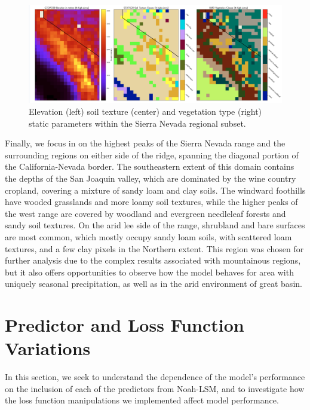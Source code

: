\begin{figure}[h!]
    \centering

    \includegraphics[width=.99\linewidth,draft=false]{figures/lt-static/static_all-3_high-sierra.png}

    \caption{Elevation (left) soil texture (center) and vegetation type (right) static parameters within the Sierra Nevada regional subset.}
    \label{lt_static_high-sierra}
\end{figure}

Finally, we focus in on the highest peaks of the Sierra Nevada range and the surrounding regions on either side of the ridge, spanning the diagonal portion of the California-Nevada border. The southeastern extent of this domain contains the depths of the San Joaquin valley, which are dominated by the wine country cropland, covering a mixture of sandy loam and clay soils. The windward foothills have wooded grasslands and more loamy soil textures, while the higher peaks of the west range are covered by woodland and evergreen needleleaf forests and sandy soil textures. On the arid lee side of the range, shrubland and bare surfaces are most common, which mostly occupy sandy loam soils, with scattered loam textures, and a few clay pixels in the Northern extent. This region was chosen for further analysis due to the complex results associated with mountainous regions, but it also offers opportunities to observe how the model behaves for area with uniquely seasonal precipitation, as well as in the arid environment of great basin.

\newpage

\section{Predictor and Loss Function Variations}

In this section, we seek to understand the dependence of the model's performance on the inclusion of each of the predictors from Noah-LSM, and to investigate how the loss function manipulations we implemented affect model performance.

